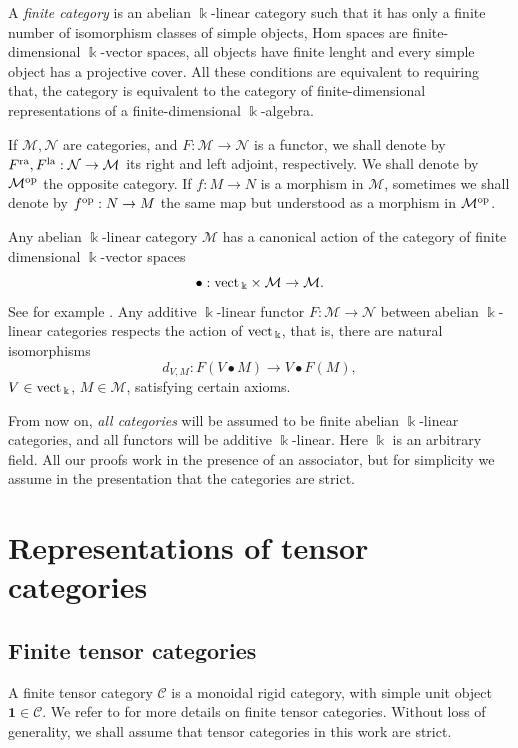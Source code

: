 \documentclass[11pt]{amsart}
\newcommand{\Mo}{{\mathcal M}}
\newcommand{\No}{{\mathcal N}}
\newcommand{\ca}{{\mathcal C}}
\newcommand{\op}{\rm{op}}
\newcommand{\ra}{\rm{ra}}
\newcommand{\la}{\rm{la}}
\newcommand{\ku}{{\Bbbk}}
\newcommand{\uno}{ \mathbf{1}}
\newcommand{\vect}{\mbox{\rm vect\,}}
\renewcommand{\_}[1]{\mbox{$_{\left( #1 \right)}$}}
\theoremstyle{plain}
\numberwithin{equation}{section}
\theoremstyle{definition}
\theoremstyle{remark}
\theoremstyle{introTheorems}
\begin{document}
 A \emph{finite  category}  \cite{EO} is an abelian $\ku$-linear category such that it has only a finite number of isomorphism
classes of simple objects, Hom spaces are finite-dimensional
$\ku$-vector spaces, all objects have finite lenght and every simple object has a projective cover. All these conditions are equivalent to requiring that, the category is equivalent to the category of finite-dimensional representations of a finite-dimensional $\ku$-algebra.

 \medbreak
 
 If $\Mo, \No$ are categories, and $F:\Mo\to \No$ is a functor, we shall denote by $F^{\ra}, F^{\la}:\No\to \Mo$ its right and left adjoint, respectively. We shall denote by $\Mo^{\op}$ the opposite category. If $f:M\to N$ is a morphism in $\Mo$, sometimes we shall denote by $f^{\op}:N\to M$ the same map but understood as a morphism in  $\Mo^{\op}$.




Any abelian $\ku$-linear category $\Mo$ has a canonical action of the category of finite dimensional $\ku$-vector spaces
\begin{equation}\label{vect-action}
 \bullet: \vect_\ku \times \Mo\to \Mo.
\end{equation}
See for example \cite[Lemma 2.2.2]{PS}. Any additive $\ku$-linear functor $F:\Mo\to \No$ between abelian $\ku$-linear categories respects the action of $\vect_\ku$, that is, there are natural isomorphisms
$$d_{V,M}:F(V \bullet M)\to V \bullet F(M),$$
$V\in \vect_\ku$, $M\in \Mo$, satisfying certain axioms.
\medbreak

\medbreak

 From now on, \emph{all categories} will be assumed to be finite  abelian $\ku$-linear categories, and all functors will be additive $\ku$-linear. Here $\ku$ is an arbitrary field. All our proofs work in the presence of an associator, but for simplicity we assume in the presentation that the categories are strict. 

\section{Representations of tensor categories}\label{Section:tensor-categories}


\subsection{Finite tensor categories}

A  finite tensor category $\ca$ is a monoidal rigid category, with simple unit object $\uno\in \ca$. We refer to \cite{EO} for more details on finite tensor categories. Without loss of generality, we shall assume that tensor categories in this work are strict. 
\end{document}
